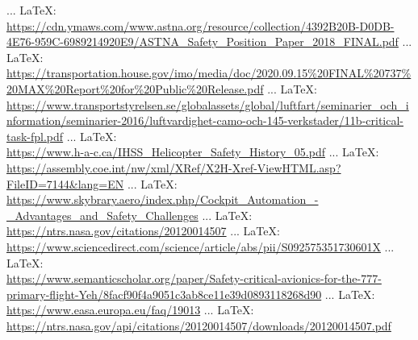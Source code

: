 \begin{thebibliography}{99}
{{ ... \LaTeX:\\ \url{https://cdn.ymaws.com/www.astna.org/resource/collection/4392B20B-D0DB-4E76-959C-6989214920E9/ASTNA_Safety_Position_Paper_2018_FINAL.pdf}
 ... \LaTeX:\\ \url{https://transportation.house.gov/imo/media/doc/2020.09.15%20FINAL%20737%20MAX%20Report%20for%20Public%20Release.pdf}
 ... \LaTeX:\\ \url{https://www.transportstyrelsen.se/globalassets/global/luftfart/seminarier_och_information/seminarier-2016/luftvardighet-camo-och-145-verkstader/11b-critical-task-fpl.pdf}
 ... \LaTeX:\\ \url{https://www.h-a-c.ca/IHSS_Helicopter_Safety_History_05.pdf}
 ... \LaTeX:\\ \url{https://assembly.coe.int/nw/xml/XRef/X2H-Xref-ViewHTML.asp?FileID=7144&lang=EN}
 ... \LaTeX:\\ \url{https://www.skybrary.aero/index.php/Cockpit_Automation_-_Advantages_and_Safety_Challenges}
 ... \LaTeX:\\ \url{https://ntrs.nasa.gov/citations/20120014507}
 ... \LaTeX:\\ \url{https://www.sciencedirect.com/science/article/abs/pii/S092575351730601X}
 ... \LaTeX:\\ \url{https://www.semanticscholar.org/paper/Safety-critical-avionics-for-the-777-primary-flight-Yeh/8facf90f4a9051c3ab8ce11e39d0893118268d90}
 ... \LaTeX:\\ \url{https://www.easa.europa.eu/faq/19013}
 ... \LaTeX:\\ \url{https://ntrs.nasa.gov/api/citations/20120014507/downloads/20120014507.pdf}
}}
\end{thebibliography}

